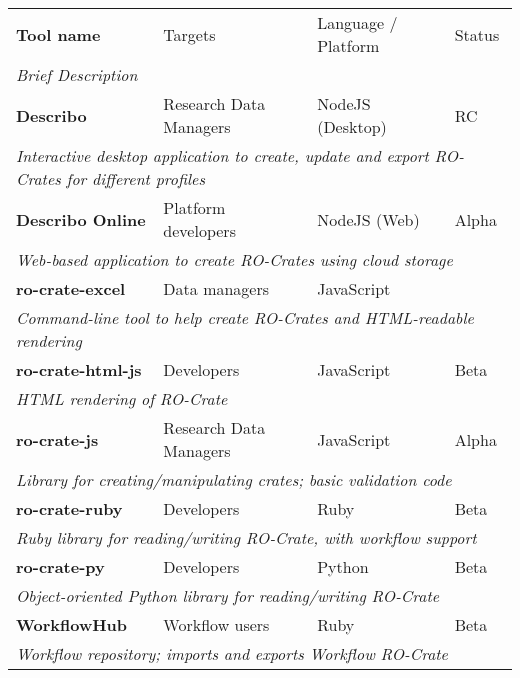 \begin{table}[htbp]
	\centering
	\begin{tabular}{llll}
		\toprule
		\textbf{Tool name} & Targets & Language / Platform & Status \\
		\multicolumn{4}{l}{\it Brief Description} \\
		\midrule
		
		\textbf{Describo} \citep{describo} & Research Data Managers & NodeJS (Desktop) & RC \\
		\multicolumn{4}{l}{\it Interactive desktop application to create, update and export RO-Crates for different profiles} \\
		
		\textbf{Describo Online} \citep{describo-online} & Platform developers & NodeJS (Web) & Alpha \\
		\multicolumn{4}{l}{\it Web-based application to create RO-Crates using cloud storage} \\
		
		\textbf{ro-crate-excel} \citep{ro-crate-excel} & Data managers & JavaScript \\
		\multicolumn{4}{l}{\it Command-line tool to help create RO-Crates and HTML-readable rendering} \\
		
		\textbf{ro-crate-html-js} \citep{ro-crate-html-js} & Developers & JavaScript & Beta \\
		\multicolumn{4}{l}{\it HTML rendering of RO-Crate}  \\
		
		\textbf{ro-crate-js} \citep{ro-crate-js} & Research Data Managers & JavaScript & Alpha \\
		\multicolumn{4}{l}{\it Library for creating/manipulating crates; basic validation code} \\
		
		\textbf{ro-crate-ruby} \citep{ro-crate-ruby} & Developers & Ruby & Beta \\
		\multicolumn{4}{l}{\it Ruby library for reading/writing RO-Crate, with workflow support} \\
		
		\textbf{ro-crate-py} \citep{ro-crate-py} & Developers & Python & Beta \\
		\multicolumn{4}{l}{\it Object-oriented Python library for reading/writing RO-Crate} \\
		
		\textbf{WorkflowHub} \citep{about-workflowhub} & Workflow users & Ruby & Beta \\
		\multicolumn{4}{l}{\it Workflow repository; imports and exports Workflow RO-Crate} \\
		

\end{tabular}
\end{table}
